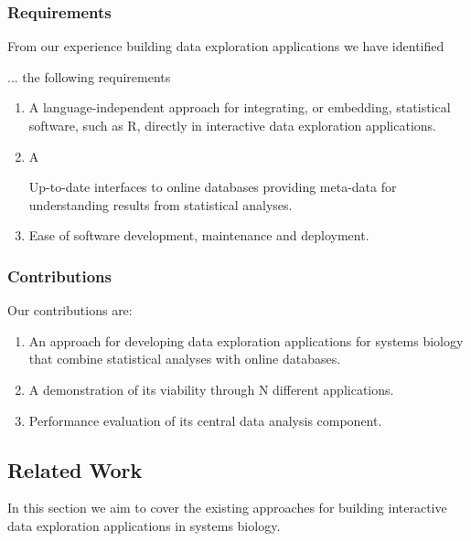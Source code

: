 

\subsubsection*{Requirements} 
From our experience building data exploration applications we have identified

... the
following requirements 

\begin{enumerate}
    \item A language-independent approach for integrating, or embedding,
        statistical software, such as R, directly in interactive data
        exploration applications.
    \item A 
        
        Up-to-date interfaces to online databases providing meta-data for
        understanding results from statistical analyses.
    \item Ease of software development, maintenance and deployment. 
\end{enumerate} 

\subsubsection*{Contributions} 
Our contributions are: 
\begin{enumerate}
\item An approach for developing data exploration applications for systems
biology that combine statistical analyses with online databases.  
\item A demonstration of its viability through N different applications. 
\item Performance evaluation of its central data analysis component. 
\end{enumerate} 


\subsection*{Related Work} 
In this section we aim to cover the existing approaches for building interactive
data exploration applications in systems biology. 


